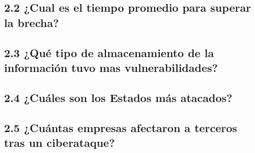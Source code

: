 \documentclass[
]{article}
\newenvironment{Shaded}{\begin{snugshade}}{\end{snugshade}}
\newcommand{\AttributeTok}[1]{\textcolor[rgb]{0.77,0.63,0.00}{#1}}
\newcommand{\DecValTok}[1]{\textcolor[rgb]{0.00,0.00,0.81}{#1}}
\newcommand{\FunctionTok}[1]{\textcolor[rgb]{0.00,0.00,0.00}{#1}}
\newcommand{\NormalTok}[1]{#1}
\newcommand{\OtherTok}[1]{\textcolor[rgb]{0.56,0.35,0.01}{#1}}
\newcommand{\SpecialCharTok}[1]{\textcolor[rgb]{0.00,0.00,0.00}{#1}}
\newcommand{\StringTok}[1]{\textcolor[rgb]{0.31,0.60,0.02}{#1}}
\begin{document}
\hypertarget{cual-es-el-tiempo-promedio-para-superar-la-brecha}{%
\subsection{2.2 ¿Cual es el tiempo promedio para superar la
brecha?}\label{cual-es-el-tiempo-promedio-para-superar-la-brecha}}

\hypertarget{quuxe9-tipo-de-almacenamiento-de-la-informaciuxf3n-tuvo-mas-vulnerabilidades}{%
\subsection{2.3 ¿Qué tipo de almacenamiento de la información tuvo mas
vulnerabilidades?}\label{quuxe9-tipo-de-almacenamiento-de-la-informaciuxf3n-tuvo-mas-vulnerabilidades}}

\hypertarget{cuuxe1les-son-los-estados-muxe1s-atacados}{%
\subsection{2.4 ¿Cuáles son los Estados más
atacados?}\label{cuuxe1les-son-los-estados-muxe1s-atacados}}

\hypertarget{cuuxe1ntas-empresas-afectaron-a-terceros-tras-un-ciberataque}{%
\subsection{2.5 ¿Cuántas empresas afectaron a terceros tras un
ciberataque?}\label{cuuxe1ntas-empresas-afectaron-a-terceros-tras-un-ciberataque}}

\begin{Shaded}
\end{Shaded}
\end{document}
